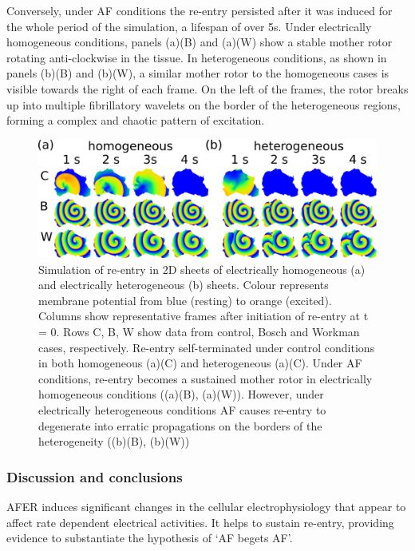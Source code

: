 Conversely, under AF conditions the re-entry persisted after it was
induced for the whole period of the simulation, a lifespan of over \unit{5}{s}.
Under electrically homogeneous conditions, panels (a)(B) and (a)(W) show a
stable mother rotor rotating anti-clockwise in the tissue.
In heterogeneous conditions, as shown in panels (b)(B) and (b)(W), a similar
mother rotor to the homogeneous cases is visible towards the right of each
frame.
On the left of the frames, the rotor breaks up into multiple fibrillatory
wavelets on the border of the heterogeneous regions, forming a complex and
chaotic pattern of excitation.

\begin{figure}
\centering
\includegraphics{figures/toolkit/afer/2d_plots}
\caption[AFER 2D re-entry plots]{
\label{fig:toolkit:afer:2d}
Simulation of re-entry in 2D sheets of electrically homogeneous
(a) and electrically heterogeneous (b) sheets.
Colour represents membrane potential from blue (resting) to orange (excited).
Columns show representative frames after initiation of re-entry at t = 0.
Rows C, B, W show data from control, Bosch and Workman cases, respectively.
Re-entry self-terminated under control conditions in both homogeneous (a)(C) and
heterogeneous (a)(C).
Under AF conditions, re-entry becomes a sustained mother rotor in
electrically homogeneous conditions ((a)(B), (a)(W)).
However, under electrically heterogeneous conditions AF causes re-entry to degenerate
into erratic propagations on the borders of the heterogeneity ((b)(B), (b)(W)) }
\end{figure}

\subsubsection{Discussion and conclusions}

AFER induces significant changes in the cellular electrophysiology that
appear to affect rate dependent electrical activities.  It helps to
sustain re-entry, providing evidence to substantiate the hypothesis of
`AF begets AF'.

